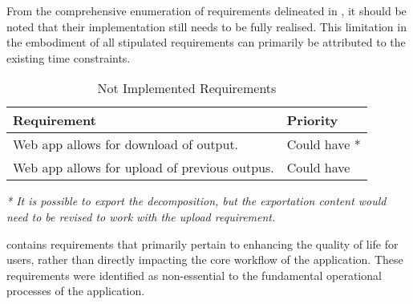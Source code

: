 From the comprehensive enumeration of requirements delineated in , it should be noted that their implementation still needs to be fully realised. This limitation in the embodiment of all stipulated requirements can primarily be attributed to the existing time constraints.

\begin{table}[!htb] \caption{Not Implemented Requirements} \label{tab:not-implemented-requirements}
  \begin{center}
    \begin{tabular}[c]{p{16em}|p{8em}}
      \textbf{Requirement} &
      \textbf{Priority} \\
      \hline Web app allows for download of output. & {Could have *} \\
      \hline Web app allows for upload of previous outpus. & {Could have} \\
    \end{tabular}
  \end{center}
 \vspace{1ex}
 {\raggedright \textit{* It is possible to export the decomposition, but the exportation content would need to be revised to work with the upload requirement.} \par}
\end{table}

 contains requirements that primarily pertain to enhancing the quality of life for users, rather than directly impacting the core workflow of the application. These requirements were identified as non-essential to the fundamental operational processes of the application.
